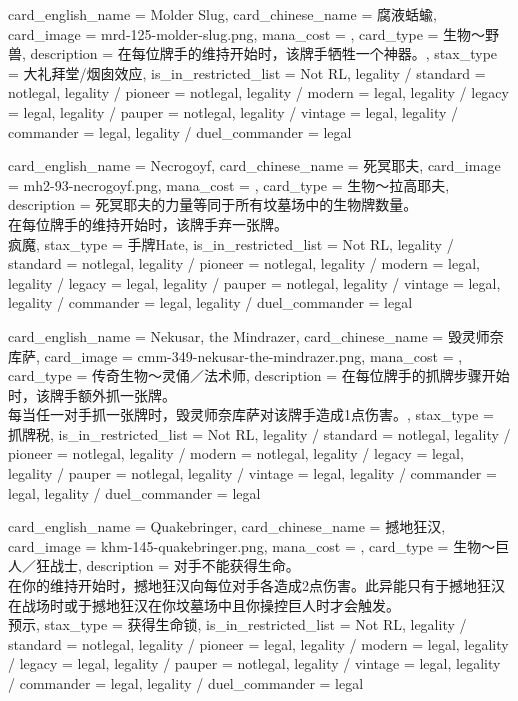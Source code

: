 \documentclass[lang = cn, color = black, 10pt]{AllThatStax}
\begin{document}
\card
{
	card_english_name = {Molder Slug},
	card_chinese_name = {腐液蛞蝓},
	card_image = mrd-125-molder-slug.png,
	mana_cost = ,
	card_type = 生物～野兽,
	description = {在每位牌手的维持开始时，该牌手牺牲一个神器。},
	stax_type = 大礼拜堂/烟囱效应,
	is_in_restricted_list = Not RL,
	legality / standard = notlegal,
	legality / pioneer = notlegal,
	legality / modern = legal,
	legality / legacy = legal,
	legality / pauper = notlegal,
	legality / vintage = legal,
	legality / commander = legal,
	legality / duel_commander = legal
}

\card
{
	card_english_name = {Necrogoyf},
	card_chinese_name = {死冥耶夫},
	card_image = mh2-93-necrogoyf.png,
	mana_cost = ,
	card_type = 生物～拉高耶夫,
	description = {死冥耶夫的力量等同于所有坟墓场中的生物牌数量。\\
在每位牌手的维持开始时，该牌手弃一张牌。\\
疯魔},
	stax_type = 手牌Hate,
	is_in_restricted_list = Not RL,
	legality / standard = notlegal,
	legality / pioneer = notlegal,
	legality / modern = legal,
	legality / legacy = legal,
	legality / pauper = notlegal,
	legality / vintage = legal,
	legality / commander = legal,
	legality / duel_commander = legal
}

\card
{
	card_english_name = {Nekusar, the Mindrazer},
	card_chinese_name = {毁灵师奈库萨},
	card_image = cmm-349-nekusar-the-mindrazer.png,
	mana_cost = ,
	card_type = 传奇生物～灵俑／法术师,
	description = {在每位牌手的抓牌步骤开始时，该牌手额外抓一张牌。\\
每当任一对手抓一张牌时，毁灵师奈库萨对该牌手造成1点伤害。},
	stax_type = 抓牌税,
	is_in_restricted_list = Not RL,
	legality / standard = notlegal,
	legality / pioneer = notlegal,
	legality / modern = notlegal,
	legality / legacy = legal,
	legality / pauper = notlegal,
	legality / vintage = legal,
	legality / commander = legal,
	legality / duel_commander = legal
}

\card
{
	card_english_name = {Quakebringer},
	card_chinese_name = {撼地狂汉},
	card_image = khm-145-quakebringer.png,
	mana_cost = ,
	card_type = 生物～巨人／狂战士,
	description = {对手不能获得生命。\\
在你的维持开始时，撼地狂汉向每位对手各造成2点伤害。此异能只有于撼地狂汉在战场时或于撼地狂汉在你坟墓场中且你操控巨人时才会触发。\\
预示},
	stax_type = 获得生命锁,
	is_in_restricted_list = Not RL,
	legality / standard = notlegal,
	legality / pioneer = legal,
	legality / modern = legal,
	legality / legacy = legal,
	legality / pauper = notlegal,
	legality / vintage = legal,
	legality / commander = legal,
	legality / duel_commander = legal
}
\end{document}
